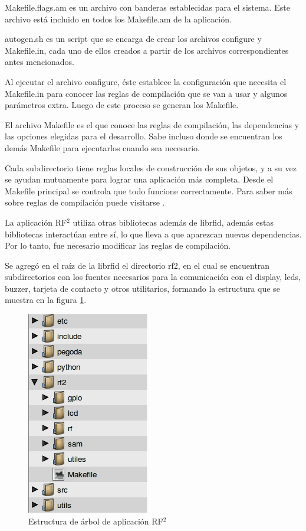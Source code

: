 Makefile.flags.am es un archivo con banderas establecidas para el sistema. Este archivo está incluido en todos los Makefile.am de la aplicación.


autogen.sh es un script que se encarga de crear los archivos configure y Makefile.in, cada uno de ellos creados a partir de los archivos correspondientes antes mencionados.

Al ejecutar el archivo configure, éste establece la configuración que necesita el Makefile.in para conocer las reglas de compilación que se van a usar y algunos parámetros extra. Luego de este proceso se generan los Makefile.

El archivo Makefile es el que conoce las reglas de compilación, las dependencias y las opciones elegidas para el desarrollo. Sabe incluso donde se encuentran los demás Makefile para ejecutarlos cuando sea necesario.

\bigskip
Cada subdirectorio tiene reglas locales de construcción de sus objetos, y a su vez se ayudan mutuamente para lograr una aplicación más completa. Desde el Makefile principal se controla que todo funcione correctamente.
Para saber más sobre reglas de compilación puede visitarse \cite{Make}.

\bigskip
La aplicación RF$^{2}$ utiliza otras bibliotecas además de librfid, además estas bibliotecas interactúan entre sí, lo que lleva a que aparezcan nuevas dependencias. Por lo tanto, fue necesario modificar las reglas de compilación.

\bigskip
Se agregó en el raíz de la librfid el directorio rf2, en el cual se encuentran subdirectorios con los fuentes necesarios para la comunicación con el display, leds, buzzer, tarjeta de contacto y otros utilitarios, formando la estructura que se muestra en la figura \ref{est_RF2}. 


\begin{figure}[H]
\centering
  \begin{center}
  \includegraphics[scale=.4]{Imagenes/estructura_librfid.png} 
  \end{center}
  \caption{Estructura de árbol de aplicación RF$^{2}$}\label{est_RF2} 
\end{figure}

